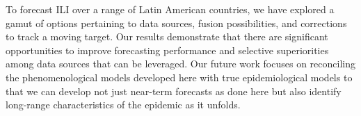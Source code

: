 To forecast ILI over a range of Latin American countries,
we have explored a gamut of options pertaining to data sources, fusion possibilities, and corrections to
track a moving target. Our results demonstrate that there are significant opportunities to
improve forecasting performance and selective superiorities among data sources that can be leveraged.
Our future work focuses on reconciling the phenomenological models developed here with true epidemiological
models to that we can develop not just near-term forecasts as done here but also identify long-range 
characteristics of the epidemic as it unfolds.
